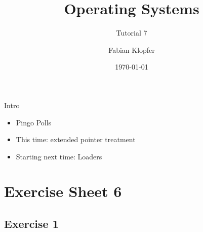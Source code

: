 \documentclass[10pt]{beamer}
\title{\textbf{Operating Systems}}
\subtitle{Tutorial 7}
\author{Fabian Klopfer}
\date{\today}
\begin{document}
\frame{\titlepage}


\begin{frame}{Intro}
\begin{itemize}
 \item Pingo Polls
 \item This time: extended pointer treatment
 \item Starting next time: Loaders 
\end{itemize}
\end{frame}

\section*{Exercise Sheet 6}
\frame{\sectionpage}
\subsection*{Exercise 1}
\frame{\subsectionpage}
\end{document}
